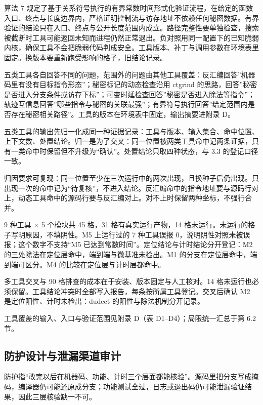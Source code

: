 算法 7 规定了基于关系符号执行的有界常数时间形式化验证流程，在给定的函数入口、终点与长度边界内，严格证明控制流与访存地址不依赖任何秘密数据。有界验证的结论只在入口、终点与公开长度范围内成立。路径完整性要单独检查，搜索被截断时工具可能返回未知而进程仍然正常退出。负对照用同一配置下的已知脆弱内核，确保工具不会把脆弱代码判成安全。工具版本、补丁与调用参数在环境表里固定。换版本要重新跑受影响的格子，旧结论记录。

五类工具各自回答不同的问题，范围外的问题由其他工具覆盖：反汇编回答”机器码里有没有目标指令形态”；秘密标记的动态检查沿用 ctgrind 的思路，回答”秘密是否进入分支条件或访存下标”；可变时延检查回答”秘密是否进入除法等指令”；轨迹互信息回答”哪些指令与秘密的关联最强”；有界符号执行回答”给定范围内是否存在秘密相关路径”。工具的版本在环境表中固定，输出摘要进附录 D。

五类工具的输出先归一化成同一种证据记录：工具与版本、输入集合、命中位置、上下文数、处置结论。归一是为了交叉：同一位置被两类工具命中记两条证据，只有一类命中时保留但不升级为“确认”。处置结论只取四种状态，与 3.3 的登记口径一致。

归因要求可复现：同一位置至少在三次运行中的两次出现，且换种子后仍出现。只出现一次的命中记为“待复核”，不进入结论。反汇编命中的指令地址要与源码行对上，动态工具命中的源码行要与反汇编对上。对不上时保留两种坐标，不强行合并。

9 种工具 × 5 个模块共 45 格，31 格有真实运行产物，14 格未运行。未运行的格子写明原因，不填阴性。M5 上运行过的 7 种工具误报 0，说明阴性对照未被误报；这个数字不支持“M5 已达到常数时间”。定位结论与计时结论分开登记：M2 的三处除法在定位层命中，端到端与微基准未检出。M1 的分支在定位层命中，端到端可区分。M4 的比较在定位层与计时层都命中。 %

多工具交叉与 90 格排查的成本在于安装、版本固定与人工核对。14 格未运行也必须保留。工具结论冲突时全部写入报告，每条按所属工具登记。交叉后确认 M2 是定位阳性、计时未检出：dudect 的阳性与除法机制分开记录。

工具覆盖的输入、入口与验证范围见附录 D（表 D1--D4）；局限统一汇总于第 6.2 节。

\subsection{防护设计与泄漏渠道审计}

防护指“改完以后在机器码、功能、计时三个层面都能核验”。源码里把分支写成掩码，编译器仍可能还原成分支；功能测试全过，日志或退出码仍可能泄漏验证结果，因此三层核验缺一不可。


